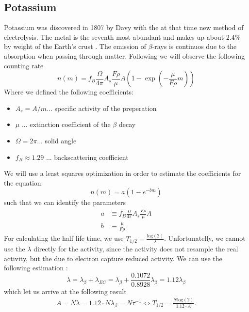 \subsection{Potassium}
\label{subsec:potassium}
Potassium was discovered in 1807 by Davy with the at that time new method of electrolysis. The metal
is the seventh most abundant and makes up about 2.4\% by weight of the Earth's crust \cite{haynes}.
The emission of $\beta$-rays is continuos due to the absorption when
passing through matter. Following \cite{ver} we will observe the following
counting rate
\begin{equation}
n(m) = f_B \frac{\Omega}{4 \pi} A_s \frac{F \rho }{\mu}A \left (1 - \exp \left ( - \frac{\mu}{F \rho}m \right ) \right )
\label{eq:potassium}
\end{equation}
Where we defined the following coefficients:
\begin{itemize}
\item[] $A_s = A/ m$... specific activity of the preperation  
\item[] $\mu$ ... extinction coefficient  of the $\beta$ decay 
\item[] $\Omega = 2 \pi$... solid angle
\item[] $f_B\approx 1.29$ ... backscattering coefficient 
\end{itemize}
We will use a least squares optimization in order to estimate the coefficients for the equation:
\begin{equation}
n(m) = a ( 1 - e^{-bm})
\end{equation}
such that we can identify the parameters
\begin{align}
a &\equiv  f_B \frac{\Omega}{4 \pi} A_s \frac{F \rho }{\mu}A  \label{eq:a}\\ 
b &\equiv \frac{\mu}{F \rho} \label{eq:b}
\end{align}
For calculating the half life time, we use $T_{1/2} = \frac{\mathrm{log}(2)}{\lambda}$. Unfortunatelly,
we cannot use the $\lambda$ directly for the activity, since the activity does not resample the real activity, but
the due to electron capture reduced activity. We can use the following estimation \cite{ver}:
\begin{equation}
\lambda = \lambda_{\beta} + \lambda_{EC} = \lambda_{\beta} + \frac{0.1072}{0.8928}\lambda_{\beta} = 1.12 \lambda_{\beta}
\label{eq:EC}
\end{equation}
which let us arrive at the following result
\begin{align}
A = N \lambda = 1.12 \cdot N\lambda_\beta= N \tau ^{-1} \Leftrightarrow  T_{1/2} = \frac{N \mathrm{log}(2)}{1.12 \cdot A}.
\label{eq:As}
\end{align}
